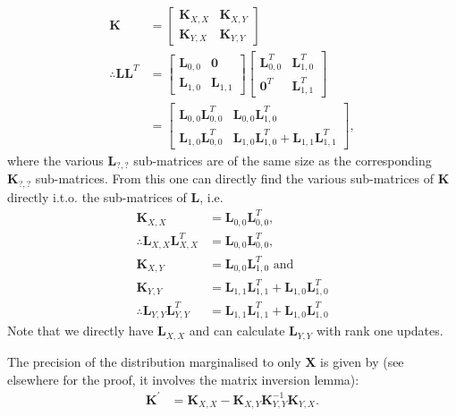 \documentclass[oneside,english]{scrbook}
\begin{document}
\begin{align*}
  \bm{K} &=
  \begin{bmatrix}
    \bm{K}_{X,X} & \bm{K}_{X,Y}\\
    \bm{K}_{Y,X} & \bm{K}_{Y,Y}
  \end{bmatrix} \\
  \therefore  \bm{L}\bm{L}^T &=
  \begin{bmatrix}
      \bm{L}_{0,0} & \bm{0}\\
      \bm{L}_{1,0} & \bm{L}_{1,1}
    \end{bmatrix}
  \begin{bmatrix}
      \bm{L}_{0,0}^T & \bm{L}_{1,0}^T\\
      \bm{0}^T & \bm{L}_{1,1}^T
  \end{bmatrix} \\
  &=
  \begin{bmatrix}
      \bm{L}_{0,0} \bm{L}_{0,0}^T & \bm{L}_{0,0}\bm{L}_{1,0}^T\\
      \bm{L}_{1,0}\bm{L}_{0,0}^T & \bm{L}_{1,0}\bm{L}_{1,0}^T+\bm{L}_{1,1}\bm{L}_{1,1}^T
    \end{bmatrix},
\end{align*}
where the various $\bm{L}_{?,?}$ sub-matrices are of the same size
as the corresponding $\bm{K}_{?,?}$ sub-matrices. From this one can
directly find the various sub-matrices of $\textbf{K}$ directly
i.t.o. the sub-matrices of $\textbf{L}$, i.e.
\begin{align}
  \bm{K}_{X,X} &= \bm{L}_{0,0} \bm{L}_{0,0}^T, \nonumber\\
  \therefore \bm{L}_{X,X} \bm{L}_{X,X}^T &= \bm{L}_{0,0} \bm{L}_{0,0}^T, \\
  \bm{K}_{X,Y} &= \bm{L}_{0,0}\bm{L}_{1,0}^T \text{ and } \\
  \bm{K}_{Y,Y} &= \bm{L}_{1,1}\bm{L}_{1,1}^T+\bm{L}_{1,0}\bm{L}_{1,0}^T \nonumber\\
  \therefore \bm{L}_{Y,Y} \bm{L}_{Y,Y}^T &= \bm{L}_{1,1}\bm{L}_{1,1}^T+\bm{L}_{1,0}\bm{L}_{1,0}^T
\end{align}
Note that we directly have $\bm{L}_{X,X}$ and can calculate $\bm{L}_{Y,Y}$ with rank one updates.

The precision of the distribution marginalised to only $\bm{X}$ is
given by (see elsewhere for the proof, it involves the matrix
inversion lemma):
  \begin{align*}
    \bm{K}^{'} &= \bm{K}_{X,X}-\bm{K}_{X,Y}\bm{K}_{Y,Y}^{-1}\bm{K}_{Y,X} \label{eq:cfmarg_K}.
  \end{align*}
\end{document}
